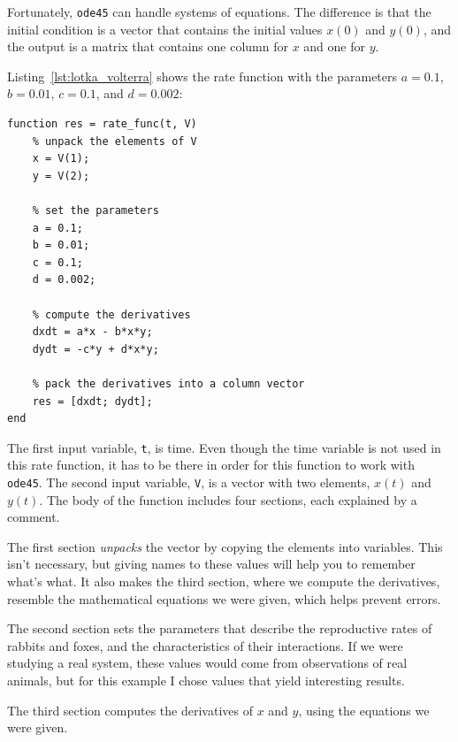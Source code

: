 
Fortunately, \lstinline{ode45} can handle systems of equations.  The
difference is that the initial condition is a vector that contains the
initial values $x(0)$ and $y(0)$, and the output is a matrix
that contains one column for $x$ and one for $y$.


Listing~\ref{lst:lotka_volterra} shows the rate function
with the parameters $a = 0.1$, $b = 0.01$, $c = 0.1$, and $d = 0.002$:

\begin{lstlisting}[caption={A rate function for Lotka-Volterra}, label={lst:lotka_volterra}]
function res = rate_func(t, V)
    % unpack the elements of V
    x = V(1);
    y = V(2);

    % set the parameters
    a = 0.1;
    b = 0.01;
    c = 0.1;
    d = 0.002;

    % compute the derivatives
    dxdt = a*x - b*x*y;
    dydt = -c*y + d*x*y;

    % pack the derivatives into a column vector
    res = [dxdt; dydt];
end
\end{lstlisting}

The first input variable, \lstinline{t}, is time.
Even though the time variable is not used in this rate function,
it has to be there in order for this function to work with \lstinline{ode45}.
The second input variable, \lstinline{V}, is a vector with two elements,
$x(t)$ and $y(t)$.
The body of the function includes four sections, each explained by a comment.

The first section \emph{unpacks} the vector by copying the elements
into variables.  This isn't necessary, but giving names to
these values will help you to remember what's what.  It also makes the third
section, where we compute the derivatives, resemble the mathematical
equations we were given, which helps prevent errors.


The second section sets the parameters that describe the
reproductive rates of rabbits and foxes, and the characteristics of
their interactions.  If we were studying a real system, these values
would come from observations of real animals, but for this example
I chose values that yield interesting results.


The third section computes the derivatives of $x$ and $y$, using the equations
we were given.

